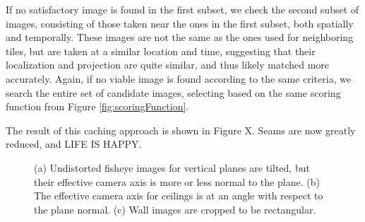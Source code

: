 \documentclass[]{spie}  %
\begin{document}
If no satisfactory image is found in the first subset, we check the
second subset of images, consisting of those taken near the ones in
the first subset, both spatially and temporally. These images are not
the same as the ones used for neighboring tiles, but are taken at a
similar location and time, suggesting that their localization and
projection are quite similar, and thus likely matched more
accurately. Again, if no viable image is found according to the same
criteria, we search the entire set of candidate images, selecting
based on the same scoring function from Figure
\ref{fig:scoringFunction}.

The result of this caching approach is shown in Figure X. Seams are now greatly reduced, and LIFE IS HAPPY.


\begin{figure}
  \centering
  \centering
  \centering
  \caption{(a) Undistorted fisheye images for vertical planes are
    tilted, but their effective camera axis is more or less normal to
    the plane. (b) The effective camera axis for ceilings is at an
    angle with respect to the plane normal. (c) Wall images are
    cropped to be rectangular.}
  \label{fig:projectionAngles}
\end{figure}
\end{document}
